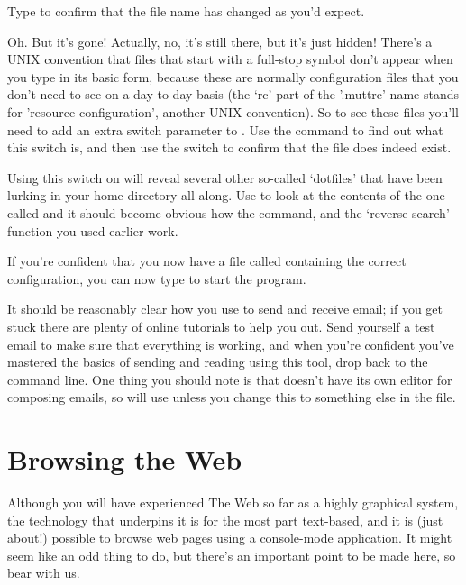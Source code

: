 Type  to confirm that the file name has changed as you'd expect. 

Oh. But it's gone! Actually, no, it's still there, but it's just hidden! There's a UNIX convention that files that start with a full-stop symbol don't appear when you type  in its basic form, because these are normally configuration files that you don't need to see on a day to day basis (the `rc' part of the '.muttrc' name stands for 'resource configuration', another UNIX convention). So to see these files you'll need to add an extra switch parameter to . Use the  command to find out what this switch is, and then use the switch to confirm that the  file does indeed exist. 

Using this switch on  will reveal several other so-called `dotfiles' that have been lurking in your home directory all along. Use  to look at the contents of the one called  and it should become obvious how the  command, and the `reverse search' function you used earlier work.

If you're confident that you now have a file called  containing the correct configuration, you can now type  to start the program. 

It should be reasonably clear how you use  to send and receive email; if you get stuck there are plenty of online tutorials to help you out. Send yourself a test email to make sure that everything is working, and when you're confident you've mastered the basics of sending and reading using this tool, drop back to the command line. One thing you should note is that  doesn't have its own editor for composing emails, so will use  unless you change this to something else in the  file. 

\section{Browsing the Web}

Although you will have experienced The Web so far as a highly graphical system, the technology that underpins it is for the most part text-based, and it is (just about!) possible to browse web pages using a console-mode application. It might seem like an odd thing to do, but there's an important point to be made here, so bear with us.


